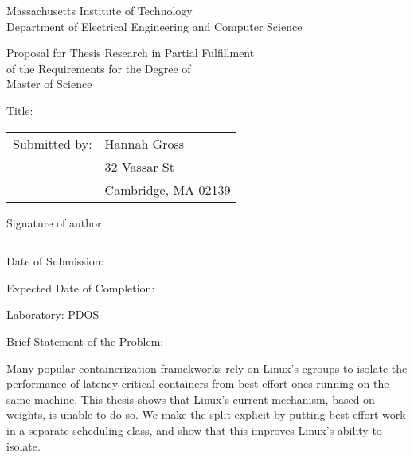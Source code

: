 
\begingroup
{}\large\selectfont


\begin{center}
Massachusetts Institute of Technology \\
Department of Electrical Engineering and Computer Science
\end{center}

\begin{center}
Proposal for Thesis Research in Partial Fulfillment \\
of the Requirements for the Degree of \\
Master of Science
\end{center}

\vspace{1em}
\noindent Title: \mytitle

\vspace{1em}
\noindent\begin{tabular}{@{}ll}
Submitted by: & Hannah Gross\\
              & 32 Vassar St \\
              & Cambridge, MA 02139
\end{tabular}

\vspace{1em}
\noindent Signature of author: \rule{5cm}{0.1pt}

\vspace{1em}
\noindent Date of Submission: \mydate

\vspace{1em}
\noindent Expected Date of Completion: \mycompletion

\vspace{1em}
\noindent Laboratory: PDOS

\vspace{1em}
\noindent Brief Statement of the Problem:

\vspace{1em}
\begin{minipage}{\dimexpr\textwidth-1cm}

\noindent Many popular containerization framekworks rely on Linux's cgroups to
isolate the performance of latency critical containers from best effort ones
running on the same machine. This thesis shows that Linux's current mechanism,
based on weights, is unable to do so. We make the split explicit by putting best
effort work in a separate scheduling class, and show that this improves Linux's
ability to isolate.

\end{minipage}

